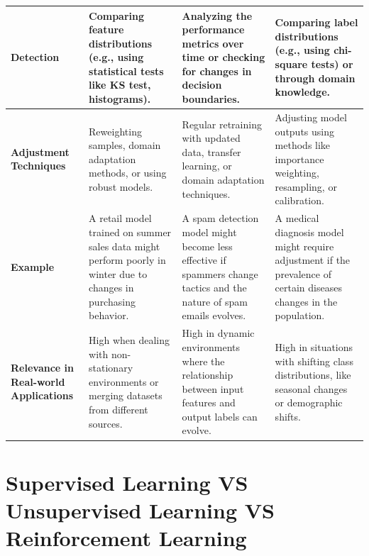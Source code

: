\begin{customTableWrapper}{1}
\begin{longtable}{|m{2cm}|m{4.5cm}|m{4.5cm}|m{4.5cm}|}
    \textbf{Detection} & Comparing feature distributions (e.g., using statistical tests like KS test, histograms). & Analyzing the performance metrics over time or checking for changes in decision boundaries. & Comparing label distributions (e.g., using chi-square tests) or through domain knowledge. \\ \hline

    \textbf{Adjustment Techniques} & Reweighting samples, domain adaptation methods, or using robust models. & Regular retraining with updated data, transfer learning, or domain adaptation techniques. & Adjusting model outputs using methods like importance weighting, resampling, or calibration. \\ \hline

    \textbf{Example} & A retail model trained on summer sales data might perform poorly in winter due to changes in purchasing behavior. & A spam detection model might become less effective if spammers change tactics and the nature of spam emails evolves. & A medical diagnosis model might require adjustment if the prevalence of certain diseases changes in the population. \\ \hline

    \textbf{Relevance in Real-world Applications} & High when dealing with non-stationary environments or merging datasets from different sources. & High in dynamic environments where the relationship between input features and output labels can evolve. & High in situations with shifting class distributions, like seasonal changes or demographic shifts. \\ \hline

\end{longtable}
\end{customTableWrapper}


\section{Supervised Learning VS Unsupervised Learning VS Reinforcement Learning \cite{chatgpt,medium-numsmt2-rl-ch1-part-1}}\label{Supervised Learning VS Unsupervised Learning VS Reinforcement Learning}

